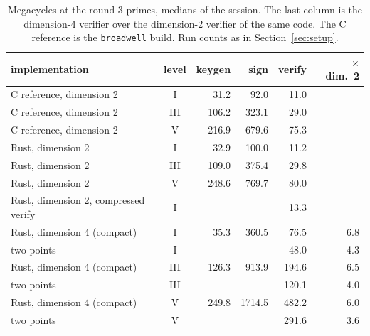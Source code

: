 \documentclass[version=preprint]{iacrcc}
\begin{document}
    \begin{table}[t]
        \centering
        \caption{Megacycles at the round-3 primes, medians of the session. The
            last column is the dimension-4 verifier over the dimension-2 verifier of
            the same code. The C reference is the \texttt{broadwell} build.
            Run counts as in Section~\ref{sec:setup}.}
        \label{tab:cycles}
        \begin{tabular}{l c r r r r}
            \toprule
            implementation & level & keygen & sign & verify & $\times$ dim.\ 2 \\
            \midrule
            C reference, dimension 2 & I   & 31.2 & 92.0 & 11.0 & \\
            C reference, dimension 2 & III & 106.2 & 323.1 & 29.0 & \\
            C reference, dimension 2 & V   & 216.9 & 679.6 & 75.3 & \\
            Rust, dimension 2 & I   & 32.9 & 100.0 & 11.2 & \\
            Rust, dimension 2 & III & 109.0 & 375.4 & 29.8 & \\
            Rust, dimension 2 & V   & 248.6 & 769.7 & 80.0 & \\
            Rust, dimension 2, compressed verify & I & & & 13.3 & \\
            Rust, dimension 4 (compact) & I & 35.3 & 360.5 & 76.5 & 6.8 \\
            \quad two points & I & & & 48.0 & 4.3 \\
            Rust, dimension 4 (compact) & III & 126.3 & 913.9 & 194.6 & 6.5 \\
            \quad two points & III & & & 120.1 & 4.0 \\
            Rust, dimension 4 (compact) & V & 249.8 & 1714.5 & 482.2 & 6.0 \\
            \quad two points & V & & & 291.6 & 3.6 \\
            \bottomrule
        \end{tabular}
    \end{table}
\end{document}
